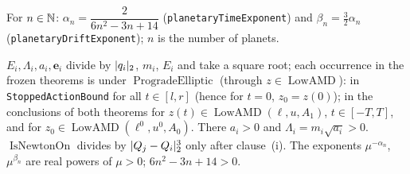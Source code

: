 \begin{definition}[Exponents]\label{bpP:p0:d25-exponents}
For $n\in\mathbb{N}$: $\alpha_n=\dfrac2{6n^2-3n+14}$ (\texttt{planetaryTimeExponent}) and $\beta_n=\tfrac32\alpha_n$ (\texttt{planetaryDriftExponent}); $n$ is the number of planets.
\end{definition}

\begin{remark}\label{bpP:p0:d25-totality}
$E_i,\Lambda_i,a_i,\mathbf e_i$ divide by $\lvert q_i\rvert_2$, $m_i$, $E_i$ and take a square root; each occurrence in the frozen theorems is under $\operatorname{ProgradeElliptic}$
(through $z\in\operatorname{LowAMD}$): in \texttt{StoppedActionBound} for all $t\in[l,r]$ (hence for $t=0$, $z_0=z(0)$); in the conclusions of both theorems for $z(t)\in\operatorname{LowAMD}(\ell,u,A_1)$, $t\in[-T,T]$,
and for $z_0\in\operatorname{LowAMD}(\ell^0,u^0,A_0)$. There $a_i>0$ and $\Lambda_i=m_i\sqrt{a_i}>0$. $\operatorname{IsNewtonOn}$ divides by $\lvert Q_j-Q_i\rvert_2^3$ only after clause~(i).
The exponents $\mu^{-\alpha_n}$, $\mu^{\beta_n}$ are real powers of $\mu>0$; $6n^2-3n+14>0$.
\end{remark}

